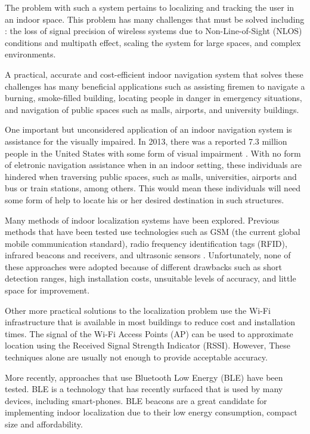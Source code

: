 \documentclass[conference]{IEEEtran}
\begin{document}
The problem with such a system pertains to localizing and tracking the user in an indoor space. This problem has many challenges that must be solved including \cite{mainetti2014survey}: the loss of signal precision of wireless systems due to Non-Line-of-Sight (NLOS) conditions and multipath effect, scaling the system for large spaces, and complex environments.

A practical, accurate and cost-efficient indoor navigation system that solves these challenges has many beneficial applications such as assisting firemen to navigate a burning, smoke-filled building, locating people in danger in emergency situations, and navigation of public spaces such as malls, airports, and university buildings.

One important but unconsidered application of an indoor navigation system is assistance for the visually impaired. In 2013, there was a reported 7.3 million people in the United States with some form of visual impairment \cite{NFB}. With no form of eletronic navigation assistance when in an indoor setting, these individuals are hindered when traversing public spaces, such as malls, universities, airports and bus or train stations, among others. This would mean these individuals will need some form of help to locate his or her desired destination in such structures.

Many methods of indoor localization systems have been explored. Previous methods that have been tested use technologies such as GSM (the current global mobile communication standard), radio frequency identification tags (RFID), infrared beacons and receivers, and ultrasonic sensors \cite{otsason2005accurate,li2011performance,liu2014survey,ward1997new,medina2013ultrasound}. Unfortunately, none of these approaches were adopted because of different drawbacks such as short detection ranges, high installation costs, unsuitable levels of accuracy, and little space for improvement.

Other more practical solutions to the localization problem use the Wi-Fi infrastructure that is available in most buildings to reduce cost and installation times. The signal of the Wi-Fi Access Points (AP) can be used to approximate location using the Received Signal Strength Indicator (RSSI). However, These techniques alone are usually not enough to provide acceptable accuracy.

More recently, approaches that use Bluetooth Low Energy (BLE) have been tested. BLE is a technology that has recently surfaced that is used by many devices, including smart-phones. BLE beacons are a great candidate for implementing indoor localization due to their low energy consumption, compact size and affordability.
\end{document}
